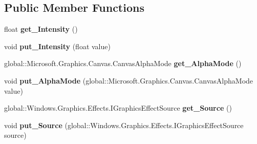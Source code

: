 \subsection*{Public Member Functions}
\begin{DoxyCompactItemize}
\item 
\mbox{\label{interface_microsoft_1_1_graphics_1_1_canvas_1_1_effects_1_1_i_sepia_effect_aee3d7d45c759c48558e8ac58694d0f0f}} 
float {\bfseries get\+\_\+\+Intensity} ()
\item 
\mbox{\label{interface_microsoft_1_1_graphics_1_1_canvas_1_1_effects_1_1_i_sepia_effect_a9682e9765a9acc23c0ba196c33ca8367}} 
void {\bfseries put\+\_\+\+Intensity} (float value)
\item 
\mbox{\label{interface_microsoft_1_1_graphics_1_1_canvas_1_1_effects_1_1_i_sepia_effect_af0e3b772c6a8f51c2b8bc71a3c7e2e09}} 
global\+::\+Microsoft.\+Graphics.\+Canvas.\+Canvas\+Alpha\+Mode {\bfseries get\+\_\+\+Alpha\+Mode} ()
\item 
\mbox{\label{interface_microsoft_1_1_graphics_1_1_canvas_1_1_effects_1_1_i_sepia_effect_a28750df56d32d0e2653893f6de5805d7}} 
void {\bfseries put\+\_\+\+Alpha\+Mode} (global\+::\+Microsoft.\+Graphics.\+Canvas.\+Canvas\+Alpha\+Mode value)
\item 
\mbox{\label{interface_microsoft_1_1_graphics_1_1_canvas_1_1_effects_1_1_i_sepia_effect_ac7c0465ec6fc4284a0f0205b572f78a8}} 
global\+::\+Windows.\+Graphics.\+Effects.\+I\+Graphics\+Effect\+Source {\bfseries get\+\_\+\+Source} ()
\item 
\mbox{\label{interface_microsoft_1_1_graphics_1_1_canvas_1_1_effects_1_1_i_sepia_effect_a1673f79e0f93155b9778ad30b74eb86b}} 
void {\bfseries put\+\_\+\+Source} (global\+::\+Windows.\+Graphics.\+Effects.\+I\+Graphics\+Effect\+Source source)
\item 

\end{DoxyCompactItemize}
